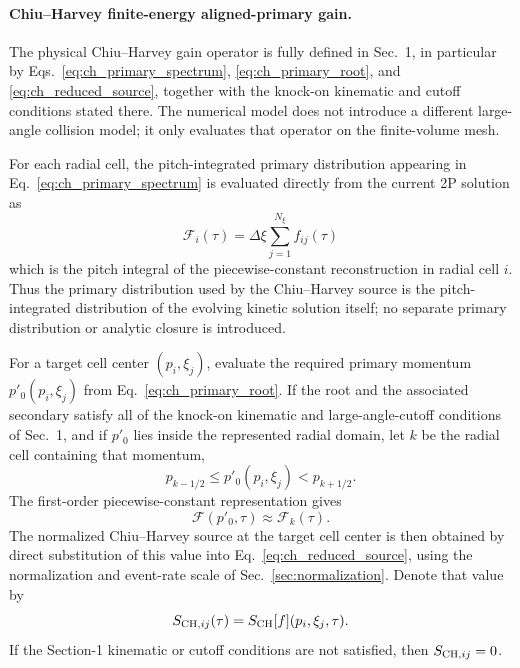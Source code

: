 \documentclass[11pt]{article}
\begin{document}
\paragraph{Chiu--Harvey finite-energy aligned-primary gain.}
The physical Chiu--Harvey gain operator is fully defined in
Sec.~1, in particular by Eqs.~\eqref{eq:ch_primary_spectrum},
\eqref{eq:ch_primary_root}, and \eqref{eq:ch_reduced_source}, together with the
knock-on kinematic and cutoff conditions stated there.  The numerical model does not
introduce a different large-angle collision model; it only evaluates that operator on
the finite-volume mesh.

For each radial cell, the pitch-integrated primary distribution appearing in
Eq.~\eqref{eq:ch_primary_spectrum} is evaluated directly from the current 2P
solution as
\begin{equation}
 \boxed{
 \mathcal F_i(\tau)
 =\Delta\xi\sum_{j=1}^{N_\xi} f_{ij}(\tau)
 }
 \label{eq:discrete_primary_spectrum}
\end{equation}
which is the pitch integral of the piecewise-constant reconstruction in radial cell
$i$.  Thus the primary distribution used by the Chiu--Harvey source is the
pitch-integrated distribution of the evolving kinetic solution itself; no separate
primary distribution or analytic closure is introduced.

For a target cell center $(p_i,\xi_j)$, evaluate the required primary momentum
$p'_0(p_i,\xi_j)$ from Eq.~\eqref{eq:ch_primary_root}.  If the root and the associated
secondary satisfy all of the knock-on kinematic and large-angle-cutoff conditions of
Sec.~1, and if $p'_0$ lies inside the represented radial domain, let $k$ be the radial
cell containing that momentum,
\begin{equation}
 p_{k-1/2}\le p'_0(p_i,\xi_j)<p_{k+1/2}.
 \label{eq:ch_primary_cell}
\end{equation}
The first-order piecewise-constant representation gives
\begin{equation}
 \mathcal F\!\left(p'_0,\tau\right)\approx\mathcal F_k(\tau).
 \label{eq:ch_piecewise_primary}
\end{equation}
The normalized Chiu--Harvey source at the target cell center is then obtained by direct
substitution of this value into Eq.~\eqref{eq:ch_reduced_source}, using the normalization
and event-rate scale of Sec.~\ref{sec:normalization}.  Denote that value by
\begin{equation}
 S_{{\rm CH},ij}(\tau)
 =S_{\rm CH}[f](p_i,\xi_j,\tau).
 \label{eq:ch_cell_center_source}
\end{equation}
If the Section-1 kinematic or cutoff conditions are not satisfied, then
$S_{{\rm CH},ij}=0$.
\end{document}
